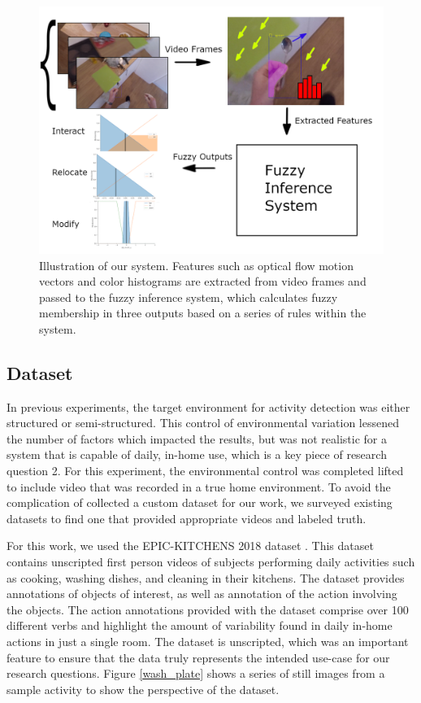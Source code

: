 \documentclass[12pt]{report}
\begin{document}
\begin{figure}[t]
\centerline{\includegraphics[width=.9\linewidth]{figure/diagram.png}}
\caption{Illustration of our system. Features such as optical flow motion vectors and color histograms are extracted from video frames and passed to the fuzzy inference system, which calculates fuzzy membership in three outputs based on a series of rules within the system.}
\label{diagram}
\end{figure}

\subsection{Dataset}
In previous experiments, the target environment for activity detection was either structured or semi-structured. This control of environmental variation lessened the number of factors which impacted the results, but was not realistic for a system that is capable of daily, in-home use, which is a key piece of research question 2. For this experiment, the environmental control was completed lifted to include video that was recorded in a true home environment. To avoid the complication of collected a custom dataset for our work, we surveyed existing datasets to find one that provided appropriate videos and labeled truth.

For this work, we used the EPIC-KITCHENS 2018 dataset \cite{Damen2018ScalingDataset}. This dataset contains unscripted first person videos of subjects performing daily activities such as cooking, washing dishes, and cleaning in their kitchens. The dataset provides annotations of objects of interest, as well as annotation of the action involving the objects. The action annotations provided with the dataset comprise over 100 different verbs and highlight the amount of variability found in daily in-home actions in just a single room. The dataset is unscripted, which was an important feature to ensure that the data truly represents the intended use-case for our research questions. Figure \ref{wash_plate} shows a series of still images from a sample activity to show the perspective of the dataset.
\end{document}
